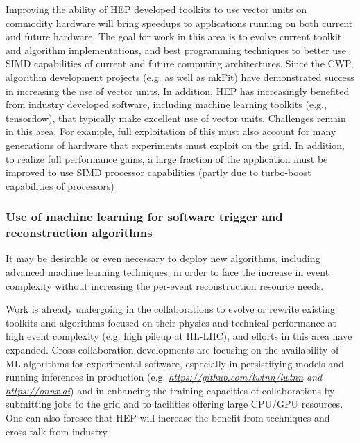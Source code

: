 Improving the ability of HEP developed toolkits to use vector units on
commodity hardware will bring speedups to applications running on both
current and future hardware. The goal for work in this area is to evolve
current toolkit and algorithm implementations, and best programming
techniques to better use SIMD capabilities of current and future
computing architectures. Since the CWP, algorithm development projects
(e.g. \cite{LHCB-FIGURE-2019-002}
as well as mkFit) have demonstrated success in increasing the use of vector
units. In addition, HEP has increasingly benefited from industry
developed software, including machine learning toolkits (e.g.,
tensorflow), that typically make excellent use of vector units.
Challenges remain in this area. For example, full exploitation of this
must also account for many generations of hardware that experiments must
exploit on the grid. In addition, to realize full performance gains, a
large fraction of the application must be improved to use SIMD processor
capabilities (partly due to turbo-boost capabilities of processors)

\hypertarget{use-of-machine-learning-for-software-trigger-and-reconstruction-algorithms}{%
\subsubsection{Use of machine learning for software trigger and
reconstruction
algorithms}\label{use-of-machine-learning-for-software-trigger-and-reconstruction-algorithms}}

It may be desirable or even necessary to deploy new algorithms,
including advanced machine learning techniques, in order to face the
increase in event complexity without increasing the per-event
reconstruction resource needs.

Work is already undergoing in the collaborations to evolve or rewrite
existing toolkits and algorithms focused on their physics and technical
performance at high event complexity (e.g. high pileup at HL-LHC), and
efforts in this area have expanded. Cross-collaboration developments are
focusing on the availability of ML algorithms for experimental software,
especially in persistifying models and running inferences in production
(e.g.
\emph{\href{https://github.com/lwtnn/lwtnn}{{https://github.com/lwtnn/lwtnn}}
and \href{https://onnx.ai}{{https://onnx.ai}}}) and in enhancing the
training capacities of collaborations by submitting jobs to the grid and
to facilities offering large CPU/GPU resources. One can also foresee
that HEP will increase the benefit from techniques and cross-talk from
industry.

